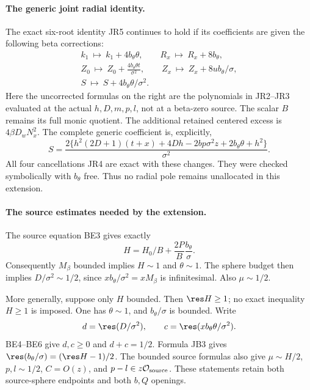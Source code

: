 \paragraph{The generic joint radial identity.}
The exact six-root identity JR5 continues to hold if its coefficients
are given the following beta corrections:
\begin{gather*}
 k_1\ \mapsto\ k_1+4b_\theta\theta,\qquad
 R_x\ \mapsto\ R_x+8b_\theta,\\
 Z_0\ \mapsto\ Z_0+\frac{4b_\theta\theta t}{\sigma^2},\qquad
 Z_x\ \mapsto\ Z_x+8ub_\theta/\sigma,\\
 S\ \mapsto\ S+4b_\theta\theta/\sigma^2.
\tag{JB1}
\end{gather*}
Here the uncorrected formulas on the right are the polynomials in
JR2--JR3 evaluated at the actual $h,D,m,p,l$, not at a beta-zero
source. The scalar $B$ remains its full monic quotient. The additional
retained centered excess is $4\beta D_wN_x^2$. The complete generic
coefficient is, explicitly,
\[
 S=\frac{2\{h^2(2D+1)(t+x)+4Dh-2bp\sigma^2z
                       +2b_\theta\theta+h^2\}}{\sigma^2}.
\tag{JB2}
\]
All four cancellations JR4 are exact with these changes. They were
checked symbolically with $b_\theta$ free. Thus no radial pole remains
unallocated in this extension.

\paragraph{The source estimates needed by the extension.}
The source equation BE3 gives exactly
\[
 H=H_0/B+\frac{2P}{B}\frac{b_\theta}{\sigma}.
\tag{JB3}
\]
Consequently $M_\beta$ bounded implies $H\sim1$ and $\theta\sim1$.
The sphere budget then implies $D/\sigma^2\sim1/2$, since
$xb_\theta/\sigma^2=xM_\beta$ is infinitesimal. Also $\mu\sim1/2$.

More generally, suppose only $H$ bounded. Then $\res H\ge1$;
no exact inequality $H\ge1$ is imposed. One has $\theta\sim1$,
and $b_\theta/\sigma$ is bounded. Write
\[
 d=\res(D/\sigma^2),\qquad
 c=\res(xb_\theta\theta/\sigma^2).
\]
BE4--BE6 give $d,c\ge0$ and $d+c=1/2$. Formula JB3 gives
$\res(b_\theta/\sigma)=(\res H-1)/2$. The bounded source formulas
also give $\mu\sim H/2$, $p,l\sim1/2$, $C=O(z)$, and
$p-l\in z\mathcal O_{\rm source}$. These statements retain both
source-sphere endpoints and both $b,Q$ openings.

